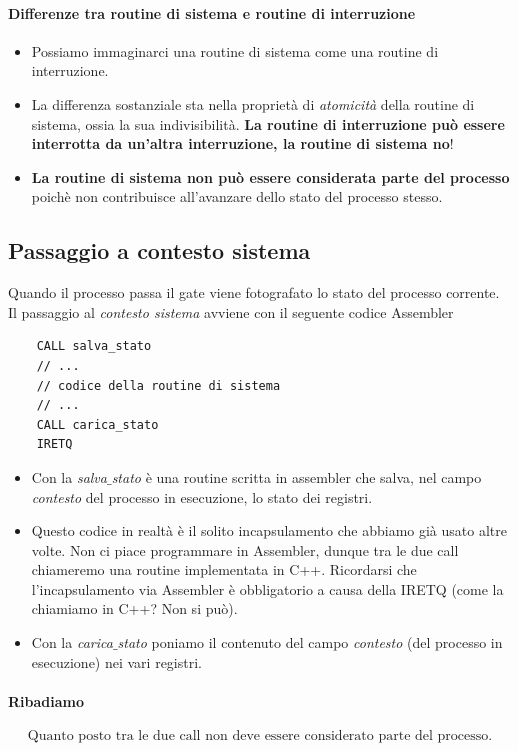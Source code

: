 \paragraph{Differenze tra routine di sistema e routine di interruzione} 
\begin{itemize}
	\item Possiamo immaginarci una routine di sistema come una routine di interruzione.
	\item La differenza sostanziale sta nella proprietà di \emph{atomicità} della routine di sistema, ossia la sua indivisibilità. \textbf{La routine di interruzione può essere interrotta da un'altra interruzione, la routine di sistema no}!
	\item \textbf{La routine di sistema non può essere considerata parte del processo} poichè non contribuisce all'avanzare dello stato del processo stesso.
\end{itemize}
\subsection{Passaggio a contesto sistema} Quando il processo passa il gate viene fotografato lo stato del processo corrente.  Il passaggio al \emph{contesto sistema} avviene con il seguente codice Assembler
\begin{verbatim}
	CALL salva_stato
	// ...
	// codice della routine di sistema
	// ...
	CALL carica_stato
	IRETQ
\end{verbatim}
\begin{itemize}
	\item Con la \emph{salva$\_$stato} è una routine scritta in assembler che salva, nel campo \emph{contesto} del processo in esecuzione, lo stato dei registri.
	\item Questo codice in realtà è il solito incapsulamento che abbiamo già usato altre volte. Non ci piace programmare in Assembler, dunque tra le due call chiameremo una routine implementata in C++. Ricordarsi che l'incapsulamento via Assembler è obbligatorio a causa della IRETQ (come la chiamiamo in C++? Non si può).
	\item Con la \emph{carica$\_$stato} poniamo il contenuto del campo \emph{contesto} (del processo in esecuzione) nei vari registri.
\end{itemize}
\paragraph{Ribadiamo}
\[\boxed{\text{Quanto posto tra le due call non deve essere considerato parte del processo.}}\]
